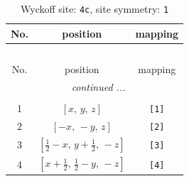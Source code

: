\documentclass[fleqn,8pt]{jsarticle}
\begin{document}
\renewcommand{\arraystretch}{1.2}
\begin{longtable}{ccc}
\caption{Wyckoff site: {\tt 4c}, site symmetry: {\tt 1}}
 \\
 \hline \hline
No. & position & mapping \\ \hline \endfirsthead

\multicolumn{2}{l}{\tablename\ \thetable{}} \\
 \hline \hline
No. & position & mapping \\ \hline \endhead

 \hline \hline
\multicolumn{2}{r}{\footnotesize\it continued ...} \\ \endfoot

 \hline \hline
\multicolumn{2}{r}{} \\ \endlastfoot

1 & $\left[ x,\, y,\, z \right]$ & {\tt [1]} \\ \hline
2 & $\left[ - x,\, - y,\, z \right]$ & {\tt [2]} \\ \hline
3 & $\left[ \frac{1}{2} - x,\, y + \frac{1}{2},\, - z \right]$ & {\tt [3]} \\ \hline
4 & $\left[ x + \frac{1}{2},\, \frac{1}{2} - y,\, - z \right]$ & {\tt [4]} \\
\end{longtable}
\end{document}
